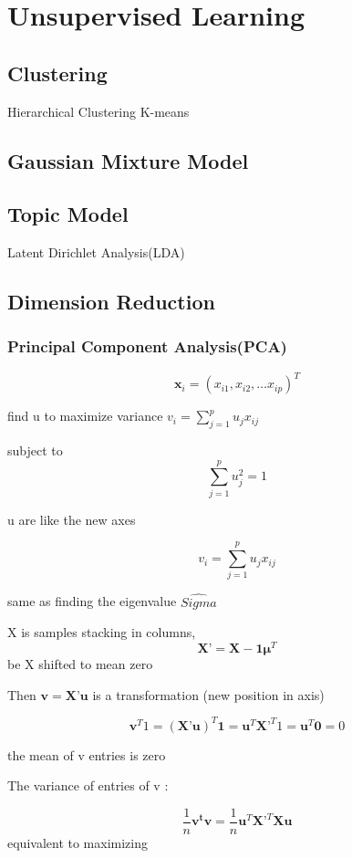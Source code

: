 \documentclass[11pt, openany]{book}              %
\begin{document}
\part{Unsupervised Learning}

\chapter{Clustering}
				Hierarchical Clustering
				K-means
\chapter{Gaussian Mixture Model}

\chapter{Topic Model}
Latent Dirichlet Analysis(LDA)


\chapter{Dimension Reduction}
\section{Principal Component Analysis(PCA)}

$$\mathbf{x}_i = (x_{i1},x_{i2},…x_{ip})^T$$

find u to maximize variance  $v_i = \sum_{j=1}^p u_j x_{ij}$

subject to $$\sum_{j=1}^p u_j^2 = 1$$

u are like the new axes 

$$v_i = \sum_{j=1}^p u_j x_{ij}$$

same as finding the eigenvalue $\hat{Sigma}$

X is samples stacking in columns,
 $$\mathbf{X}’ = \mathbf{X} - \mathbf{1}\mathbold{\mu}^T$$ be X shifted to mean zero

Then $\mathbf{v} = \mathbf{X}’ \mathbf{u}$ is a transformation (new position in axis)

$$\mathbf{v}^T 1 = (\mathbf{X}’\mathbf{u})^T \mathbf{1} = \mathbf{u}^T \mathbf{X}’^T 1 =  \mathbf{u}^T  \mathbf{0} = 0$$

the mean of v entries is zero 

The variance of entries of v : 

$$\frac{1}{n}\mathbf{v^tv} =  \frac{1}{n} \mathbf{u}^T\mathbf{X}’^T\mathbf{X} \mathbf{u}$$
equivalent to maximizing 
\end{document}
